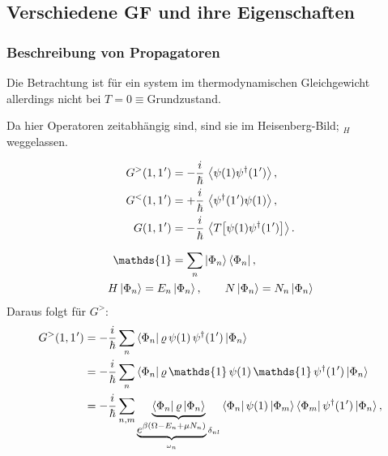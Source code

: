 \subsection[Verschiedene GF und ihre Eigenschaften im thermodynamischen Gleichgewicht]{Verschiedene GF und ihre Eigenschaften}
\subsubsection*{Beschreibung von Propagatoren}

Die Betrachtung ist für ein system im thermodynamischen Gleichgewicht allerdings nicht bei $T=0\equiv$Grundzustand.




Da hier Operatoren zeitabhängig sind, sind sie im Heisenberg-Bild; $_H$ weggelassen.

\begin{align*}
  G^{>}(1,1\mkern1mu') & = -\frac{i}{\hbar}\,\left\langle\psi(1)\psi^{\dagger}(1\mkern1mu')\right\rangle,                 \\
  G^{<}(1,1\mkern1mu') & = +\frac{i}{\hbar}\,\left\langle\psi^{\dagger}(1\mkern1mu')\psi(1)\right\rangle,                 \\
  G(1,1\mkern1mu')     & = -\frac{i}{\hbar}\,\left\langle T\!\left[\psi(1)\psi^{\dagger}(1\mkern1mu')\right]\right\rangle.
\end{align*}

\begin{equation}
  \begin{aligned}
    \mathds{1}        & = \sum_n \ket{\Phi_n}\bra{\Phi_n}, \\
    H\ket{\Phi_n}=E_n & \ket{\Phi_n} ,\qquad
    N\ket{\Phi_n}=N_n\ket{\Phi_n}
  \end{aligned}
\end{equation}
Daraus folgt für $G^>$:
\begin{equation}
  \begin{aligned}
    G^{>}(1,1\mkern1mu')
     & = -\frac{i}{\hbar}\sum_n\bra{\Phi_n}\varrho\,\psi(1)\,\psi^{\dagger}(1\mkern1mu')\ket{\Phi_n}                         \\
     & = -\frac{i}{\hbar}\sum_n\bra{\Phi_n}\varrho\,\mathds{1}\,\psi(1)\,\mathds{1}\,\psi^{\dagger}(1\mkern1mu')\ket{\Phi_n} \\
     & = -\frac{i}{\hbar}\sum_{n,m}
    \underbrace{\bra{\Phi_n}\varrho\ket{\Phi_n}}_{\underbrace{e^{\beta(\Omega-E_n+\mu N_n)}}_{\omega_n} \delta_{nl}}
    \bra{\Phi_n}\psi(1)\ket{\Phi_m}
    \bra{\Phi_m}\psi^{\dagger}(1\mkern1mu')\ket{\Phi_n},
  \end{aligned}
\end{equation}

